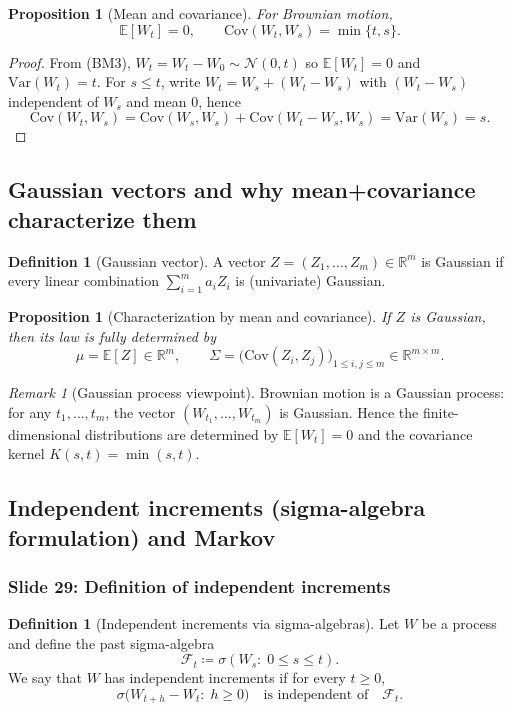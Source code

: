 \documentclass[11pt]{article}
\newtheorem{proposition}[theorem]{Proposition}
\theoremstyle{definition}
\newtheorem{definition}[theorem]{Definition}
\theoremstyle{remark}
\newtheorem{remark}[theorem]{Remark}
\newcommand{\E}{\mathbb{E}}
\newcommand{\Var}{\mathrm{Var}}
\newcommand{\Cov}{\mathrm{Cov}}
\newcommand{\R}{\mathbb{R}}
\newcommand{\cF}{\mathcal{F}}
\begin{document}
\begin{proposition}[Mean and covariance]
For Brownian motion,
\[
\E[W_t]=0,
\qquad
\Cov(W_t,W_s)=\min\{t,s\}.
\]
\end{proposition}

\begin{proof}
From (BM3), $W_t=W_t-W_0\sim\mathcal{N}(0,t)$ so $\E[W_t]=0$ and $\Var(W_t)=t$.
For $s\le t$, write $W_t=W_s+(W_t-W_s)$ with $(W_t-W_s)$ independent of $W_s$ and mean $0$, hence
\[
\Cov(W_t,W_s)=\Cov(W_s,W_s)+\Cov(W_t-W_s,W_s)=\Var(W_s)=s.
\]
\end{proof}

\subsection{Gaussian vectors and why mean+covariance characterize them}

\begin{definition}[Gaussian vector]
A vector $Z=(Z_1,\dots,Z_m)\in\R^m$ is Gaussian if every linear combination $\sum_{i=1}^m a_i Z_i$ is (univariate) Gaussian.
\end{definition}

\begin{proposition}[Characterization by mean and covariance]
If $Z$ is Gaussian, then its law is fully determined by
\[
\mu=\E[Z]\in\R^m,
\qquad
\Sigma=\big(\Cov(Z_i,Z_j)\big)_{1\le i,j\le m}\in\R^{m\times m}.
\]
\end{proposition}

\begin{remark}[Gaussian process viewpoint]
Brownian motion is a Gaussian process: for any $t_1,\dots,t_m$, the vector $(W_{t_1},\dots,W_{t_m})$ is Gaussian.
Hence the finite-dimensional distributions are determined by $\E[W_t]=0$ and the covariance kernel $K(s,t)=\min(s,t)$.
\end{remark}

\subsection{Independent increments (sigma-algebra formulation) and Markov}

\subsubsection*{Slide 29: Definition of independent increments}

\begin{definition}[Independent increments via sigma-algebras]
Let $W$ be a process and define the past sigma-algebra
\[
\cF_t \coloneqq \sigma(W_s:\;0\le s\le t).
\]
We say that $W$ has independent increments if for every $t\ge0$,
\[
\sigma\big(W_{t+h}-W_t:\;h\ge0\big)
\quad\text{is independent of}\quad
\cF_t.
\]
\end{definition}
\end{document}
